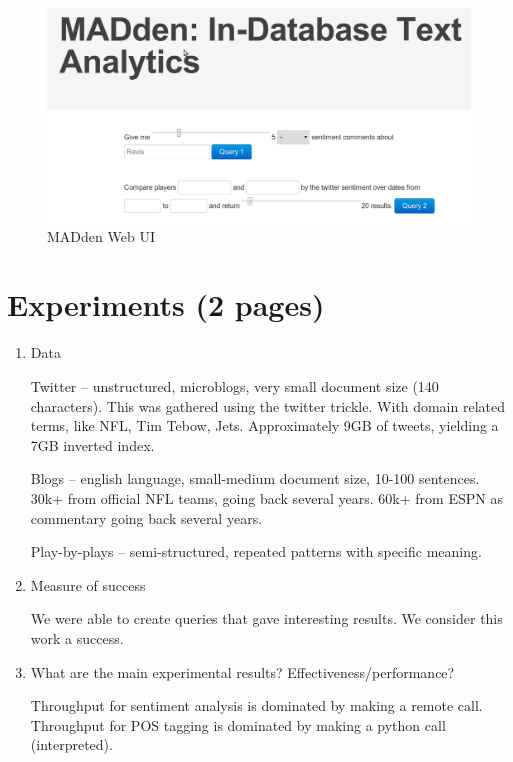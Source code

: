 \documentclass[11pt]{article}
\newcommand{\system}{MADden\xspace}
\begin{document}
  \begin{figure}
    \begin{center}
      \includegraphics[scale=0.3]{web-ui.png}
      \caption{{\system} Web UI}
      \label{fig:web-ui}
    \end{center}
  \end{figure}

  \section{Experiments (2 pages)}
  \begin{enumerate}
    \item Data

		Twitter -- unstructured, microblogs, very small document size (140 characters). This was gathered using the twitter trickle. With domain related terms, like NFL, Tim Tebow, Jets.
    Approximately 9GB of tweets, yielding a 7GB inverted index.

    Blogs -- english language, small-medium document size, 10-100 sentences.
    30k+ from official NFL teams, going back several years.
    60k+ from ESPN as commentary going back several years.

    Play-by-plays -- semi-structured, repeated patterns with specific meaning.

	\item Measure of success

		We were able to create queries that gave interesting results.
		We consider this work a success.


  \item What are the main experimental results? Effectiveness/performance?

    Throughput for sentiment analysis is dominated by making a remote call.
    Throughput for POS tagging is dominated by making a python call (interpreted).

  \end{enumerate}
\end{document}
